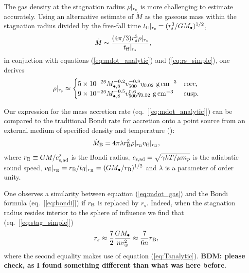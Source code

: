 \documentclass[usenatbib,fleqn]{mn2e}
\newcommand{\rs}{r_s}
\newcommand{\Mbh}[1][]{M_{\bullet#1}}
\newcommand{\Mbheight}{M_{\bullet,8}}
\newcommand{\vwO}{v_{w}}
\newcommand{\tff}{t_{\rm ff}}
\begin{document}
The gas density at the stagnation radius $\rho|_{r_{\rm s}}$ is more challenging to estimate accurately.  Using an alternative estimate of $\dot{M}$ as the gaseous mass within the stagnation radius divided by the free-fall time $t_{\rm ff}|_{r_{\rm s}} = (r_{\rm s}^{3}/GM_{\bullet})^{1/2}$,
\begin{align}
  &\dot{M}\sim\frac{(4 \pi/3) \rs^3 \rho|_{r_{\rm s}}}{\tff|_{r_{\rm s}}},
  \label{eq:mdot_gas}
\end{align}
 in conjuction with equations (\ref{eq:mdot_analytic}) and (\ref{eq:rs_simple}), one derives
\begin{align}
  \rho|_{r_{\rm s}}\approx
  \begin{cases}
    5 \times 10^{-26} \Mbheight^{-0.2} v_{500}^{-0.8}  \eta_{0.02} \,
    \, {\rm g \, cm^{-3}}& \text{core},\\
    9 \times 10^{-26}  \Mbheight^{-0.5} v_{500}^{0.6}  \eta_{0.02} \,\, {\rm g \,cm^{-3}} & \text{cusp}.
  \end{cases}
  \label{eq:rhors}
\end{align}


Our expression for the mass accretion rate (eq.~[\ref{eq:mdot_analytic}]) can be compared to the traditional Bondi rate for accretion onto a point source from an external medium of specified density and temperature (\citealt{Bondi52}):
\begin{align}
  \dot{M}_{\rm B} =4\pi \lambda r_{\rm B}^2 \rho|_{r_{\rm B}}v_{\rm ff}|_{r_{\rm B}},
\label{eq:bondi}
\end{align}
where $r_{\rm B} \equiv GM/c_{\rm s,ad}^{2}$ is the Bondi radius, $c_{\rm s,ad} = \sqrt{\gamma kT/\mu m_p}$ is the adiabatic sound speed, $v_{\rm ff}|_{r_{\rm B}} = r_{\rm B}/t_{\rm ff}|_{r_{\rm B}} = (GM_{\bullet}/r_{\rm B})^{1/2}$ and $\lambda$ is a parameter of order unity.  

One observes a similarity between equation (\ref{eq:mdot_gas}) and the Bondi formula (eq.~[\ref{eq:bondi}]) if $r_{\rm B}$ is replaced by $\rs$.  Indeed, when the stagnation radius resides interior to the sphere of influence we find that (eq.~[\ref{eq:stag_simple}])
\begin{align}
  \rs\approx\frac{7}{2}\frac{G \Mbh}{n \vwO^2} \approx \frac{7}{6n}r_{\rm B},
  \label{eq:rs_simple}
\end{align}
where the second equality makes use of equation (\ref{eq:Tanalytic}).  {\bf BDM: please check, as I found something different than what was here before}.   
\end{document}
